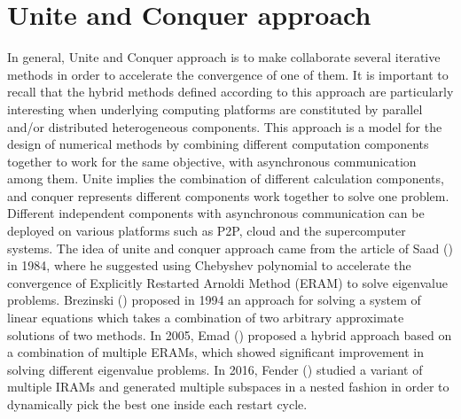 \vspace{0.6in}

\section{Unite and Conquer approach}

In general, Unite and Conquer approach is to make collaborate several iterative methods in order to accelerate the convergence of one of them. It is important to recall that the hybrid methods defined according to this approach are particularly interesting when underlying computing platforms are constituted by parallel and/or distributed heterogeneous components. This approach is a model for the design of numerical methods by combining different computation components together to work for the same objective, with asynchronous communication among them. Unite implies the combination of different calculation components, and conquer represents different components work together to solve one problem. Different independent components with asynchronous communication can be deployed on various platforms such as P2P, cloud and the supercomputer systems. The idea of unite and conquer approach came from the article of Saad (\cite{saad1984chebyshev}) in 1984, where he suggested using Chebyshev polynomial to accelerate the convergence of Explicitly Restarted Arnoldi Method (ERAM) to solve eigenvalue problems. Brezinski (\cite{brezinski1994hybrid}) proposed in 1994 an approach for solving a system of linear equations which takes a combination of two arbitrary approximate solutions of two methods. In 2005, Emad (\cite{emad2005multiple}) proposed a hybrid approach based on a combination of multiple ERAMs, which showed significant improvement in solving different eigenvalue problems. In 2016, Fender (\cite{fender2016leveraging}) studied a variant of multiple IRAMs and generated multiple subspaces in a nested fashion in order to dynamically pick the best one inside each restart cycle.

